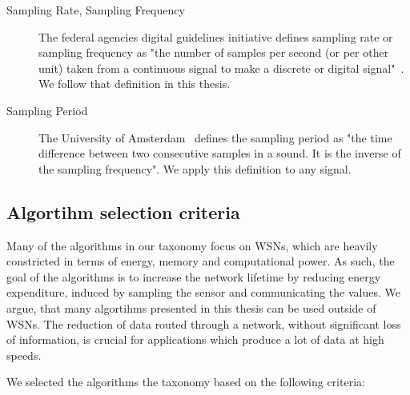 \begin{description}
    \item[Sampling Rate, Sampling Frequency]
        The federal agencies digital guidelines initiative defines sampling
        rate or sampling frequency as "the number of samples per second (or per
        other unit) taken from a continuous signal to make a discrete or
        digital signal"~\cite{samplingrate}. We follow that definition in this
        thesis.

    \item[Sampling Period]
        The University of Amsterdam~\cite{samplingperiod} defines the sampling
        period as "the time difference between two consecutive samples in a
        sound. It is the inverse of the sampling frequency". We apply this
        definition to any signal.

\end{description}
\par

\subsection{Algortihm selection criteria}
\label{sec:Algortihm selection criteria}

Many of the algorithms in our taxonomy focus on \acp{WSN}, which are heavily
constricted in terms of energy, memory and computational power. As such, the
goal of the algorithms is to increase the network lifetime by reducing energy
expenditure, induced by sampling the sensor and communicating the values. We
argue, that many algortihms presented in this thesis can be used outside of
\acp{WSN}. The reduction of data routed through a network, without significant
loss of information, is crucial for applications which produce a lot of data at
high speeds.

We selected the algorithms the taxonomy based on the following criteria:

